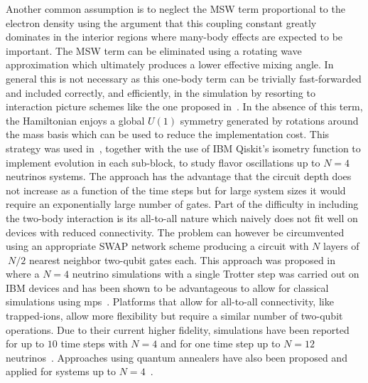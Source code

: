 Another common assumption is to neglect the MSW term proportional to the electron density using the argument that this coupling constant greatly dominates in the interior regions where many-body effects are expected to be important. The MSW term can be eliminated using a rotating wave approximation which ultimately produces a lower effective mixing angle. In general this is not necessary as this one-body term can be trivially fast-forwarded and included correctly, and efficiently, in the simulation by resorting to interaction picture schemes like the one proposed in~\cite{Rajput2022hybridizedmethods}. In the absence of this term, the Hamiltonian enjoys a global $U(1)$ symmetry generated by rotations around the mass basis which can be used to reduce the implementation cost. This strategy was used in~\cite{Yeter2022}, together with the use of IBM Qiskit’s isometry function to implement evolution in each sub-block, to study flavor oscillations up to  $N=4$ neutrinos systems. The approach has the advantage that the circuit depth does not increase as a function of the time steps but for large system sizes it would require an exponentially large number of gates. Part of the difficulty in including the two-body interaction is its all-to-all nature which naively does not fit well on devices with reduced connectivity. The problem can however be circumvented using an appropriate SWAP network scheme producing a circuit with $N$ layers of $~N/2$ nearest neighbor two-qubit gates each. This approach was proposed in~\cite{Hal21} where a $N=4$ neutrino simulations with a single Trotter step was carried out on IBM devices and has been shown to be advantageous to allow for classical simulations using \gls{mps}~\cite{Roggero2021}. Platforms that allow for all-to-all connectivity,  like trapped-ions, allow more flexibility but require a similar number of two-qubit operations. Due to their current higher fidelity, simulations have been reported for up to $10$ time steps with $N=4$ and for one time step up to $N=12$ neutrinos~\cite{Amitrano2022,Illa2022b}. Approaches using quantum annealers have also been proposed and applied for systems up to $N=4$~\cite{Illa2022a}.

